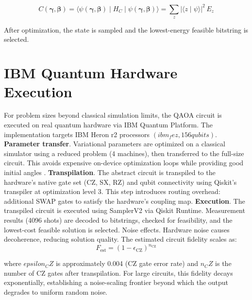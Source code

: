 \begin{equation}
C(\boldsymbol{\gamma}, \boldsymbol{\beta}) 
= \langle \psi(\boldsymbol{\gamma}, \boldsymbol{\beta}) \mid H_C \mid \psi(\boldsymbol{\gamma}, \boldsymbol{\beta}) \rangle
= \sum_{z} \left| \langle z \mid \psi \rangle \right|^2 \, E_z
\end{equation}

After optimization, the state is sampled and the lowest-energy feasible bitstring is selected.

\section{IBM Quantum Hardware Execution}
For problem sizes beyond classical simulation limits, the QAOA circuit is executed on real quantum hardware via IBM Quantum Platform. The implementation targets IBM Heron r2 processors $(ibm_fez, 156 qubits)$.
\textbf{Parameter transfer}. Variational parameters are optimized on a classical simulator using a reduced problem (4 machines), then transferred to the full-size circuit. This avoids expensive on-device optimization loops while providing good initial angles \cite{Brandao2018}. \textbf{Transpilation}. The abstract circuit is transpiled to the hardware's native gate set (CZ, SX, RZ) and qubit connectivity using Qiskit's transpiler at optimization level 3. This step introduces routing overhead: additional SWAP gates to satisfy the hardware's coupling map. \textbf{Execution}. The transpiled circuit is executed using SamplerV2 via Qiskit Runtime. Measurement results (4096 shots) are decoded to bitstrings, checked for feasibility, and the lowest-cost feasible solution is selected.
Noise effects. Hardware noise causes decoherence, reducing solution quality. The estimated circuit fidelity scales as:
\begin{equation}
F_{\text{est}} = (1 - \epsilon_{\text{CZ}})^{n_{\text{CZ}}}
\end{equation}

where $epsilon_CZ$ is approximately 0.004 (CZ gate error rate) and $n_CZ$ is the number of CZ gates after transpilation. For large circuits, this fidelity decays exponentially, establishing a noise-scaling frontier beyond which the output degrades to uniform random noise.

